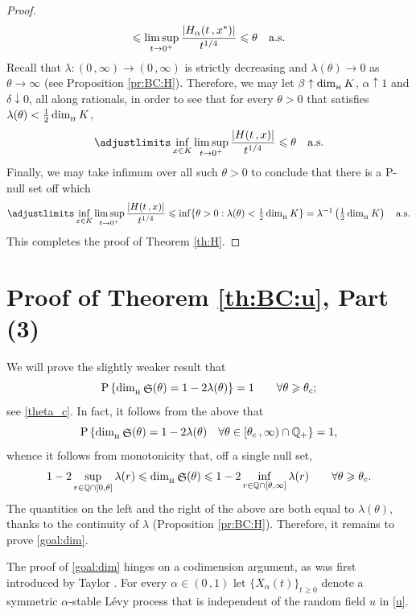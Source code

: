 \documentclass[reqno]{amsart}
\DeclareMathOperator{\dimh}{dim_{_{\rm H}}}
\DeclareMathOperator{\fS}{\mathfrak S}
\newcommand{\<}{\langle}
\renewcommand{\>}{\rangle}
\newcommand{\Q}{\mathbb{Q}}
\renewcommand{\P}{\mathrm{P}}
\newcommand{\1}{\mathbb{1}}
\renewcommand{\ge}{\geqslant}
\renewcommand{\le}{\leqslant}
\theoremstyle{definition}
\numberwithin{equation}{section}
\begin{document}
\begin{proof}
\[		\le \limsup_{t\to0^+} \frac{%
		|H_{\alpha}(t\,,x^*)|}{t^{1/4}} \le \theta\quad\text{a.s.}
	\]
	Recall that $\lambda: (0\,,\infty) \to (0\,,\infty)$ is strictly decreasing and $\lambda(\theta) \to 0$ as $\theta \to \infty$ 
	(see Proposition \ref{pr:BC:H}).
	Therefore, we may let $\beta \uparrow \dimh K$, $\alpha \uparrow 1$ 
	and $\delta \downarrow 0$, all along rationals, in order to see that for every 
	$\theta>0$ that satisfies $\lambda(\theta) < \tfrac12 \dimh K$,
	\[
		\adjustlimits\inf_{x \in K} \limsup_{t\to0^+} \frac{|H(t\,,x)|}{t^{1/4}} \le \theta
		\quad\text{a.s.}
	\]
	Finally, we may take infimum over all such $\theta>0$ to 
	conclude that there is a $\P$-null set off which
	\[
		\adjustlimits\inf_{x \in K} \limsup_{t\to0^+} 
		\frac{|H(t\,,x)|}{t^{1/4}} \le \inf\{\theta>0 : \lambda(\theta)<\tfrac12 \dimh K\}
		=\lambda^{-1}\left(\tfrac12\dimh K\right)\quad\text{a.s.}
	\]
	This completes the proof of Theorem \ref{th:H}.
\end{proof} 

\section{Proof of Theorem \ref{th:BC:u}, Part (3)}
We will prove the slightly weaker result that
\begin{equation}\label{goal:dim}
	\P\left\{ \dimh \fS(\theta) = 
	1-2\lambda(\theta)\right\} =1 \qquad\forall \theta\ge\theta_c;
\end{equation}
see \eqref{theta_c}.
In fact, it follows from the above that
\[
	\P\left\{ \dimh \fS(\theta) = 1-2\lambda(\theta)
	\quad \forall \theta\in[\theta_c\,,\infty)\cap\Q_+\right\} =1,
\]
whence it follows from monotonicity that, off a single null set,
\[
	1-2\sup_{r\in\Q\cap[0,\theta]}
	\lambda(r) \le \dimh \fS(\theta) \le 1-2\inf_{r\in\Q\cap[\theta,\infty]}
	\lambda(r) 
	\qquad\forall \theta\ge\theta_c.
\]
The quantities on the left and the right of the above are both
equal to $\lambda(\theta)$, thanks to the continuity
of $\lambda$ (Proposition \ref{pr:BC:H}). Therefore, it remains to prove \eqref{goal:dim}.

The proof of \eqref{goal:dim}
hinges on a codimension argument, as was first introduced by
Taylor \cite[Theorem 4]{Taylor1966}. 
For every $\alpha\in(0\,,1)$ let $\{X_\alpha(t)\}_{t\ge0}$ denote
a symmetric $\alpha$-stable L\'evy process that is independent of the
random field $u$ in \eqref{u}.
\end{document}
